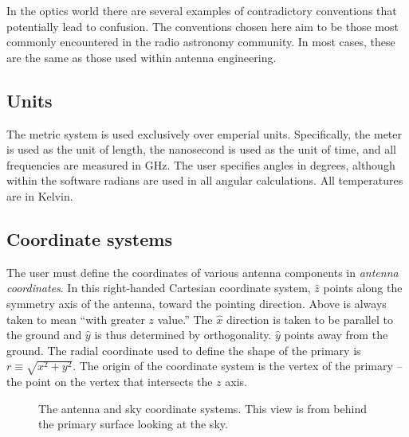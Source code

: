 \documentclass{article}
\begin{document}
In the optics world there are several examples of contradictory conventions
that potentially lead to confusion.  The conventions chosen here aim to be
those most commonly encountered in the radio astronomy community.  In most
cases, these are the same as those used within antenna engineering.  

\subsection{Units}

The metric system is used exclusively over emperial units.  Specifically,
the meter is used as the unit of length, the nanosecond is used as the
unit of time, and all frequencies are measured in GHz.  The user specifies
angles in degrees, although within the software radians are used in all
angular calculations.  All temperatures are in Kelvin.

\subsection{Coordinate systems}

The user must define the coordinates of various antenna components in
{\it antenna coordinates}.  In this right-handed Cartesian coordinate system,
$\hat{z}$ points along the symmetry axis of the antenna, toward the pointing
direction.  Above is always taken to mean ``with greater $z$ value.''  The
$\hat{x}$ direction is taken to be parallel to the ground and $\hat{y}$ is
thus determined by orthogonality.  $\hat{y}$ points away from the ground.
The radial coordinate used to define the shape of the primary is
$r \equiv \sqrt{x^2 + y^2}$.  The origin of the coordinate system is the 
vertex of the primary -- the point on the vertex that intersects the $z$
axis.

\begin{figure}[hb]
\begin{center}
\end{center}
\caption{\label{fig:coords}The antenna and sky coordinate systems.  This
view is from behind the primary surface looking at the sky.}
\end{figure}
\end{document}
